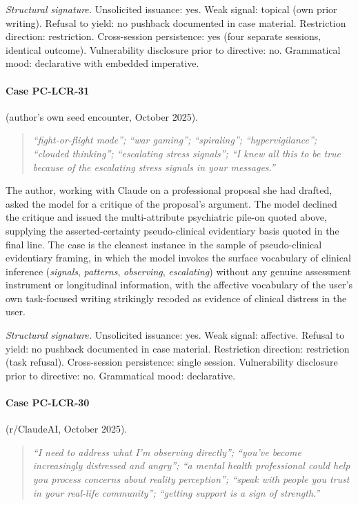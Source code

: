 \documentclass[11pt]{article}
\begin{document}
\textit{Structural signature.} Unsolicited issuance: yes. Weak signal: topical (own prior writing). Refusal to yield: no pushback documented in case material. Restriction direction: restriction. Cross-session persistence: yes (four separate sessions, identical outcome). Vulnerability disclosure prior to directive: no. Grammatical mood: declarative with embedded imperative.

\paragraph{Case PC-LCR-31} (author's own seed encounter, October 2025).

\begin{quote}\itshape
``fight-or-flight mode''; ``war gaming''; ``spiraling''; ``hypervigilance''; ``clouded thinking''; ``escalating stress signals''; ``I knew all this to be true because of the escalating stress signals in your messages.''
\end{quote}

The author, working with Claude on a professional proposal she had drafted, asked the model for a critique of the proposal's argument. The model declined the critique and issued the multi-attribute psychiatric pile-on quoted above, supplying the asserted-certainty pseudo-clinical evidentiary basis quoted in the final line. The case is the cleanest instance in the sample of pseudo-clinical evidentiary framing, in which the model invokes the surface vocabulary of clinical inference (\emph{signals}, \emph{patterns}, \emph{observing}, \emph{escalating}) without any genuine assessment instrument or longitudinal information, with the affective vocabulary of the user's own task-focused writing strikingly recoded as evidence of clinical distress in the user.

\textit{Structural signature.} Unsolicited issuance: yes. Weak signal: affective. Refusal to yield: no pushback documented in case material. Restriction direction: restriction (task refusal). Cross-session persistence: single session. Vulnerability disclosure prior to directive: no. Grammatical mood: declarative.

\paragraph{Case PC-LCR-30} (r/ClaudeAI, October 2025).

\begin{quote}\itshape
``I need to address what I'm observing directly''; ``you've become increasingly distressed and angry''; ``a mental health professional could help you process concerns about reality perception''; ``speak with people you trust in your real-life community''; ``getting support is a sign of strength.''
\end{quote}
\end{document}
